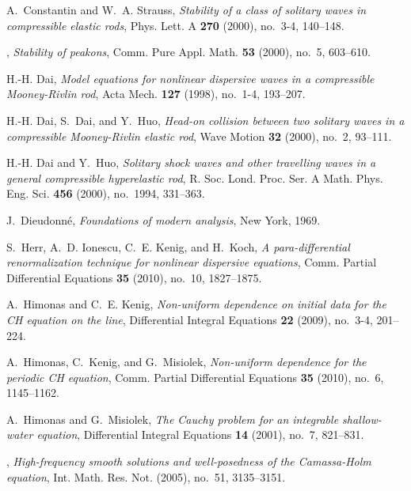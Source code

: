 \documentclass[12pt,reqno]{amsbook}
\numberwithin{section}{chapter}
\numberwithin{equation}{section}  %
\theoremstyle{remark}
\begin{document}
\begin{thebibliography}{HIKK10}
A.~Constantin and W.~A. Strauss, \emph{{Stability of a class of solitary waves
  in compressible elastic rods}}, Phys. Lett. A \textbf{270} (2000), no.~3-4,
  140--148.

\bysame, \emph{{Stability of peakons}}, Comm. Pure Appl. Math. \textbf{53}
  (2000), no.~5, 603--610.

H.-H. Dai, \emph{{Model equations for nonlinear dispersive waves in a
  compressible Mooney-Rivlin rod}}, Acta Mech. \textbf{127} (1998), no.~1-4,
  193--207.

H.-H. Dai, S.~Dai, and Y.~Huo, \emph{{Head-on collision between two solitary
  waves in a compressible Mooney-Rivlin elastic rod}}, Wave Motion \textbf{32}
  (2000), no.~2, 93--111.

H.-H. Dai and Y.~Huo, \emph{{Solitary shock waves and other travelling waves in
  a general compressible hyperelastic rod}}, R. Soc. Lond. Proc. Ser. A Math.
  Phys. Eng. Sci. \textbf{456} (2000), no.~1994, 331--363.

J.~Dieudonn{\'e}, \emph{{Foundations of modern analysis}}, New York, 1969.

S.~Herr, A.~D. Ionescu, C.~E. Kenig, and H.~Koch, \emph{{A para-differential
  renormalization technique for nonlinear dispersive equations}}, Comm. Partial
  Differential Equations \textbf{35} (2010), no.~10, 1827--1875.

A.~Himonas and C.~E. Kenig, \emph{{Non-uniform dependence on initial data for
  the CH equation on the line}}, Differential Integral Equations \textbf{22}
  (2009), no.~3-4, 201--224.

A.~Himonas, C.~Kenig, and G.~Misiolek, \emph{{Non-uniform dependence for the
  periodic CH equation}}, Comm. Partial Differential Equations \textbf{35}
  (2010), no.~6, 1145--1162.

A.~Himonas and G.~Misiolek, \emph{{The Cauchy problem for an integrable
  shallow-water equation}}, Differential Integral Equations \textbf{14} (2001),
  no.~7, 821--831.

\bysame, \emph{{High-frequency smooth solutions and well-posedness of the
  Camassa-Holm equation}}, Int. Math. Res. Not. (2005), no.~51, 3135--3151.


\end{thebibliography}
\end{document}
